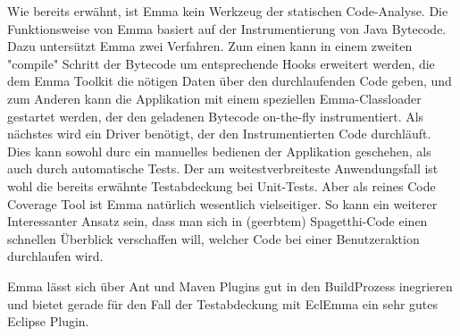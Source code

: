 Wie bereits erwähnt, ist Emma kein Werkzeug der statischen Code-Analyse. Die Funktionsweise von Emma basiert auf der Instrumentierung von Java Bytecode. Dazu untersützt Emma zwei Verfahren. Zum einen kann in einem zweiten "compile" Schritt der Bytecode um entsprechende Hooks erweitert werden, die dem Emma Toolkit die nötigen Daten über den durchlaufenden Code geben, und zum Anderen kann die Applikation mit einem speziellen Emma-Classloader gestartet werden, der den geladenen Bytecode on-the-fly instrumentiert. Als nächstes wird ein Driver benötigt, der den Instrumentierten Code durchläuft. Dies kann sowohl durc ein manuelles bedienen der Applikation geschehen, als auch durch automatische Tests. Der am weitestverbreiteste Anwendungsfall ist wohl die bereits erwähnte Testabdeckung bei Unit-Tests. Aber als reines Code Coverage Tool ist Emma natürlich wesentlich vielseitiger. So kann ein weiterer Interessanter Ansatz sein, dass man sich in (geerbtem) Spagetthi-Code einen schnellen Überblick verschaffen will, welcher Code bei einer Benutzeraktion durchlaufen wird.

Emma lässt sich über Ant und Maven Plugins gut in den BuildProzess inegrieren und bietet gerade für den Fall der Testabdeckung mit EclEmma ein sehr gutes Eclipse Plugin.

